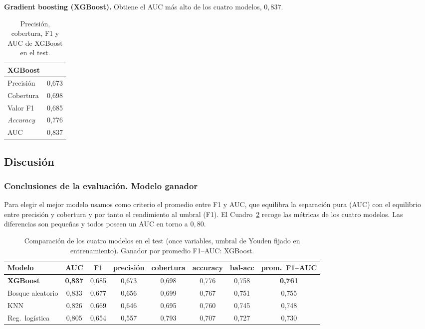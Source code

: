 \documentclass[12pt,a4paper]{report}
\theoremstyle{definition}
\begin{document}
\textbf{Gradient boosting (XGBoost).} Obtiene el AUC más alto de los cuatro modelos, $0{,}837$.

\begin{table}[H]
\centering\small
\begin{tabular}{lc}
\toprule
XGBoost & \\
\midrule
Precisión & 0,673 \\
Cobertura & 0,698 \\
Valor F1 & 0,685 \\
\emph{Accuracy} & 0,776 \\
AUC & 0,837 \\
\bottomrule
\end{tabular}
\caption{Precisión, cobertura, F1 y AUC de XGBoost en el test.}
\label{tab:met-xgb}
\end{table}

\subsection{Discusión}
\label{sec:sota}

\subsubsection{Conclusiones de la evaluación. Modelo ganador}
\label{sec:winner}

Para elegir el mejor modelo usamos como criterio el promedio entre F1 y AUC, que equilibra
la separación pura (AUC) con el equilibrio entre precisión y cobertura y por tanto el rendimiento al umbral (F1). El Cuadro~\ref{tab:modelos}
recoge las métricas de los cuatro modelos. Las diferencias son pequeñas y todos poseen un AUC en torno a $0{,}80$.

\begin{table}[H]
\centering
\small
\begin{tabular}{lccccccc}
\toprule
Modelo & AUC & F1 & precisión & cobertura & accuracy & bal-acc & prom.\ F1--AUC \\
\midrule
\textbf{XGBoost} & \textbf{0,837} & 0,685 & 0,673 & 0,698 & 0,776 & 0,758 & \textbf{0,761} \\
Bosque aleatorio & 0,833 & 0,677 & 0,656 & 0,699 & 0,767 & 0,751 & 0,755 \\
KNN & 0,826 & 0,669 & 0,646 & 0,695 & 0,760 & 0,745 & 0,748 \\
Reg.\ logística & 0,805 & 0,654 & 0,557 & 0,793 & 0,707 & 0,727 & 0,730 \\
\bottomrule
\end{tabular}
\caption{Comparación de los cuatro modelos en el test (once variables, umbral de
Youden fijado en entrenamiento). Ganador por promedio F1--AUC: XGBoost.}
\label{tab:modelos}
\end{table}
\end{document}
